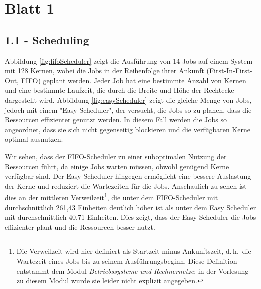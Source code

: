 \section*{Blatt 1}

\subsection*{1.1 - Scheduling}

Abbildung \ref{fig:fifoScheduler} zeigt die Ausführung von 14 Jobs auf einem System mit 128 Kernen, wobei die Jobs in der Reihenfolge ihrer Ankunft (First-In-First-Out, FIFO) geplant werden. Jeder Job hat eine bestimmte Anzahl von Kernen und eine bestimmte Laufzeit, die durch die Breite und Höhe der Rechtecke dargestellt wird.
Abbildung \ref{fig:easyScheduler} zeigt die gleiche Menge von Jobs, jedoch mit einem "Easy Scheduler", der versucht, die Jobs so zu planen, dass die Ressourcen effizienter genutzt werden. In diesem Fall werden die Jobs so angeordnet, dass sie sich nicht gegenseitig blockieren und die verfügbaren Kerne optimal ausnutzen.

Wir sehen, dass der FIFO-Scheduler zu einer suboptimalen Nutzung der Ressourcen führt, da einige Jobs warten müssen, obwohl genügend Kerne verfügbar sind. Der Easy Scheduler hingegen ermöglicht eine bessere Auslastung der Kerne und reduziert die Wartezeiten für die Jobs.
Anschaulich zu sehen ist dies an der mittleren Verweilzeit\footnote{Die Verweilzeit wird hier definiert als Startzeit minus Ankunftszeit, d.\,h.\ die Wartezeit eines Jobs bis zu seinem Ausführungsbeginn. Diese Definition entstammt dem Modul \textit{Betriebssysteme und Rechnernetze}; in der Vorlesung zu diesem Modul wurde sie leider nicht explizit angegeben.}, die unter dem FIFO-Scheduler mit durchschnittlich 261,43 Einheiten deutlich höher ist als unter dem Easy Scheduler mit durchschnittlich 40,71 Einheiten. Dies zeigt, dass der Easy Scheduler die Jobs effizienter plant und die Ressourcen besser nutzt.


